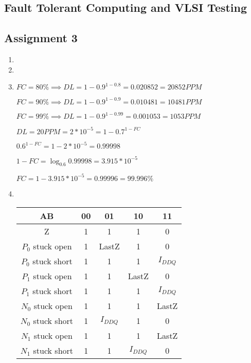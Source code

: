 \documentclass[a4paper,12pt]{article}
\begin{document}
    \begin{center}
        \section*{Fault Tolerant Computing and VLSI Testing}
        \subsection*{Assignment 3}
    \end{center}

    \begin{enumerate}

        \item

        \item

        \item $FC = 80\% \implies DL = 1 - 0.9^{1-0.8} = 0.020852 = 20852PPM$

        $FC = 90\% \implies DL = 1 - 0.9^{1-0.9} = 0.010481 = 10481PPM$

        $FC = 99\% \implies DL = 1 - 0.9^{1-0.99} = 0.001053 = 1053PPM$

        $DL = 20PPM = 2 * 10^{-5} = 1 - 0.7^{1 - FC}$

        $0.6^{1 - FC} = 1 - 2 * 10^{-5} = 0.99998$

        $1 - FC = \log_{0.6}0.99998 = 3.915 * 10^{-5}$

        $FC = 1 - 3.915 * 10^{-5} = 0.99996 = 99.996\%$

        \item \mbox{}\\

            \begin{tabular}{|c|c|c|c|c|}
                \hline
                AB              & 00 & 01      & 10      & 11      \\ \hline
                Z               & 1  & 1       & 1       & 0       \\ \hline
                $P_0$ stuck open  & 1  & LastZ   & 1       & 0       \\ \hline
                $P_0$ stuck short & 1  & 1       & 1       & $I_{DDQ}$ \\ \hline
                $P_1$ stuck open  & 1  & 1       & LastZ   & 0       \\ \hline
                $P_1$ stuck short & 1  & 1       & 1       & $I_{DDQ}$ \\ \hline
                $N_0$ stuck open  & 1  & 1       & 1       & LastZ   \\ \hline
                $N_0$ stuck short & 1  & $I_{DDQ}$ & 1       & 0       \\ \hline
                $N_1$ stuck open  & 1  & 1       & 1       & LastZ   \\ \hline
                $N_1$ stuck short & 1  & 1       & $I_{DDQ}$ & 0       \\ \hline
            \end{tabular}


\end{enumerate}
\end{document}
